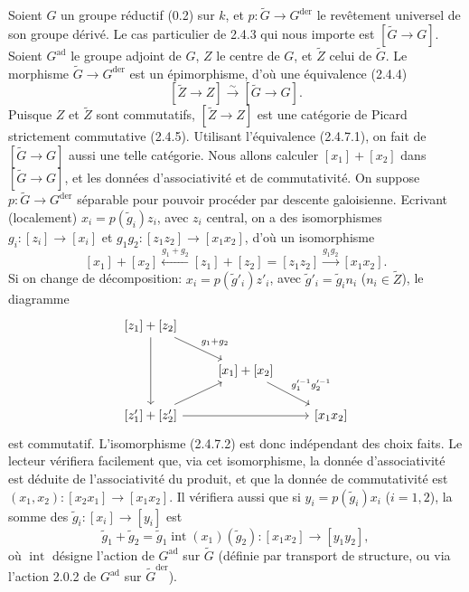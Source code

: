 \documentclass[12pt,a4paper]{article}
\theoremstyle{plain}
\theoremstyle{definition}
\theoremstyle{remark}
\DeclareMathOperator{\Int}{int}
\newcommand{\simto}{\xrightarrow{\sim}}
\begin{document}
Soient $G$ un groupe r\'eductif (0.2) sur $k$, et $p:\tilde{G} \to G^{\text{der}}$ le rev\^etement universel de son groupe d\'eriv\'e. Le cas particulier de 2.4.3 qui nous importe est $[\tilde{G} \to G]$. Soient $G^{\text{ad}}$ le groupe adjoint de $G$, $Z$ le centre de $G$, et $\tilde{Z}$ celui de $\tilde{G}$. Le morphisme $\tilde{G} \to G^{\text{der}}$ est un \'epimorphisme, d'o\`u une \'equivalence (2.4.4)
\begin{equation}\label{eq:2.4.7.1}
[\tilde{Z} \to Z] \simto [\tilde{G} \to G].
\end{equation}
Puisque $Z$ et $\tilde{Z}$ sont commutatifs, $[\tilde{Z} \to Z]$ est une cat\'egorie de Picard strictement commutative (2.4.5). Utilisant l'\'equivalence (2.4.7.1), on fait de $[\tilde{G} \to G]$ aussi une telle cat\'egorie. Nous allons calculer $[x_1] + [x_2]$ dans $[\tilde{G} \to G]$, et les donn\'ees d'associativit\'e et de commutativit\'e. On suppose $p:\tilde{G} \to G^{\text{der}}$ s\'eparable pour pouvoir proc\'eder par descente galoisienne. Ecrivant (localement) $x_i = p(\tilde{g}_i)z_i$, avec $z_i$ central, on a des isomorphismes $g_i: [z_i] \to [x_i]$ et $g_1g_2: [z_1z_2] \to [x_1x_2]$, d'o\`u un isomorphisme
\begin{equation}\label{eq:2.4.7.2}
[x_1] + [x_2] \xleftarrow{g_1+g_2} [z_1] + [z_2] = [z_1z_2] \xrightarrow{g_1g_2} [x_1x_2].
\end{equation}
Si on change de d\'ecomposition: $x_i = p(\tilde{g}'_i)z'_i$, avec $\tilde{g}'_i = \tilde{g}_i n_i$ ($n_i \in \tilde{Z}$), le diagramme
\[
\begin{tikzcd}
{[z_1] + [z_2]} \arrow[dd] \arrow[dr, "g_1+g_2"] \\
& {[x_1] + [x_2]} \arrow[dr, "g_1'^{-1}g_2'^{-1}"] \\
{[z'_1] + [z'_2]} \arrow[rr] \arrow[ur] && {[x_1x_2]}
\end{tikzcd}
\]
est commutatif. L'isomorphisme (2.4.7.2) est donc ind\'ependant des choix faits. Le lecteur v\'erifiera facilement que, via cet isomorphisme, la donn\'ee d'associativit\'e est d\'eduite de l'associativit\'e du produit, et que la donn\'ee de commutativit\'e est $(x_1,x_2): [x_2x_1] \to [x_1x_2]$. Il v\'erifiera aussi que si $y_i = p(\tilde{g}_i)x_i$ ($i=1,2$), la somme des $\tilde{g}_i: [x_i] \to [y_i]$ est
\[
\tilde{g}_1 + \tilde{g}_2 = \tilde{g}_1 \Int(x_1)(\tilde{g}_2): [x_1x_2] \to [y_1y_2],
\]
o\`u $\Int$ d\'esigne l'action de $G^{\text{ad}}$ sur $\tilde{G}$ (d\'efinie par transport de structure, ou via l'action 2.0.2 de $G^{\text{ad}}$ sur $\tilde{G}^{\text{der}}$).
\end{document}
